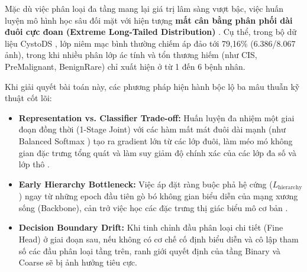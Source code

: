 \documentclass[runningheads]{llncs}
\begin{document}
Mặc dù việc phân loại đa tầng mang lại giá trị lâm sàng vượt bậc, việc huấn luyện mô hình học sâu đối mặt với hiện tượng \textbf{mất cân bằng phân phối dài đuôi cực đoan (Extreme Long-Tailed Distribution)} \cite{ref_lee2026cystods}. Cụ thể, trong bộ dữ liệu CystoDS \cite{ref_lee2026cystods}, lớp niêm mạc bình thường chiếm áp đảo tới 79,16\% (6.386/8.067 ảnh), trong khi nhiều phân lớp ác tính và tổn thương hiếm (như CIS, PreMalignant, BenignRare) chỉ xuất hiện ở từ 1 đến 6 bệnh nhân.

Khi giải quyết bài toán này, các phương pháp hiện hành bộc lộ ba mâu thuẫn kỹ thuật cốt lõi:
\begin{itemize}
    \item \textbf{Representation vs. Classifier Trade-off:} Huấn luyện đa nhiệm một giai đoạn đồng thời (1-Stage Joint) với các hàm mất mát đuôi dài mạnh (như Balanced Softmax \cite{ref_ren2020balanced}) tạo ra gradient lớn từ các lớp đuôi, làm méo mó không gian đặc trưng tổng quát và làm suy giảm độ chính xác của các lớp đa số và lớp thô \cite{ref_kang2020decoupling}.
    \item \textbf{Early Hierarchy Bottleneck:} Việc áp đặt ràng buộc phả hệ cứng ($L_{\text{hierarchy}}$) ngay từ những epoch đầu tiên gò bó không gian biểu diễn của mạng xương sống (Backbone), cản trở việc học các đặc trưng thị giác biểu mô cơ bản \cite{ref_liu2021swin}.
    \item \textbf{Decision Boundary Drift:} Khi tinh chỉnh đầu phân loại chi tiết (Fine Head) ở giai đoạn sau, nếu không có cơ chế cố định biểu diễn và cô lập tham số các đầu phân loại tầng trên, ranh giới quyết định của tầng Binary và Coarse sẽ bị ảnh hưởng tiêu cực.
\end{itemize}
\end{document}
